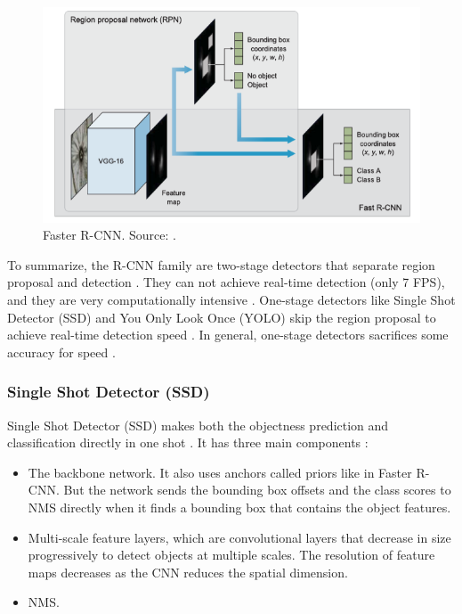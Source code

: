 \documentclass[a4paper, 11pt, oneside]{article}
\begin{document}
\begin{figure}[ht]
  \begin{center}
    \includegraphics[width=.8\textwidth]{faster_r_cnn.png}
  \end{center}
  \caption{Faster R-CNN. Source: \cite{elgendy2020deep}.}
\end{figure}

To summarize, the R-CNN family are two-stage detectors that separate region proposal and detection
\cite{elgendy2020deep, liu2020deep}. They can not achieve real-time detection (only 7 FPS), and they are very
computationally intensive \cite{elgendy2020deep, liu2016ssd, redmon2016you}.
One-stage detectors like Single Shot Detector (SSD) and You Only Look Once (YOLO) skip the region proposal to achieve
real-time detection speed \cite{elgendy2020deep}. In general, one-stage detectors sacrifices some accuracy for speed
\cite{elgendy2020deep, lin2017focal}.

\subsubsection{Single Shot Detector (SSD)}

Single Shot Detector (SSD) makes both the objectness prediction and classification directly in one shot
\cite{elgendy2020deep, liu2016ssd}. It has three main components \cite{elgendy2020deep, liu2016ssd}:

\begin{itemize}
  \item The backbone network. It also uses anchors called priors like in Faster R-CNN.
  But the network sends the bounding box offsets and the class scores to NMS directly when it finds a bounding box that
  contains the object features.
  \item Multi-scale feature layers, which are convolutional layers that decrease in size progressively to detect objects
  at multiple scales. The resolution of feature maps decreases as the CNN reduces the spatial dimension.
  \item NMS.
\end{itemize}
\end{document}
